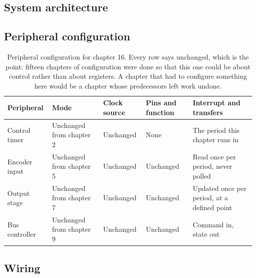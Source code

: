 \subsection*{System architecture}


\subsection*{Peripheral configuration}

\begin{table}[H]\centering\small
\begin{tabular}{p{22mm}p{26mm}p{24mm}p{30mm}p{30mm}}
\toprule
Peripheral & Mode & Clock source & Pins and function & Interrupt and transfers \\
\midrule
Control timer & Unchanged from chapter 2 & Unchanged & None & The period this chapter runs in \\
Encoder input & Unchanged from chapter 5 & Unchanged & Unchanged & Read once per period, never polled \\
Output stage & Unchanged from chapter 7 & Unchanged & Unchanged & Updated once per period, at a defined point \\
Bus controller & Unchanged from chapter 9 & Unchanged & Unchanged & Command in, state out \\
\bottomrule
\end{tabular}
\caption{Peripheral configuration for chapter 16. Every row says unchanged, which is the point: fifteen chapters of configuration were done so that this one could be about control rather than about registers. A chapter that had to configure something here would be a chapter whose predecessors left work undone.}
\end{table}

\subsection*{Wiring}


